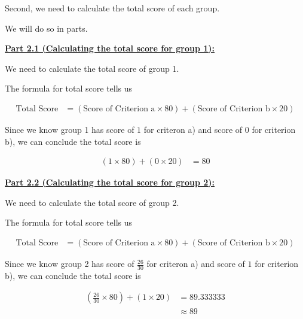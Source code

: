 \documentclass[12pt]{article}
\begin{document}
\begin{itemize}
    \bigskip

    Second, we need to calculate the total score of each group.

    \bigskip

    We will do so in parts.

    \bigskip

    \underline{\textbf{Part 2.1 (Calculating the total score for group 1):}}

    \bigskip

    We need to calculate the total score of group 1.

    \bigskip

    The formula for total score tells us

    \begin{align}
        \text{Total Score} &= (\text{Score of Criterion a} \times 80) + (\text{Score of Criterion b} \times 20)
    \end{align}

    \bigskip

    Since we know group 1 has score of $1$ for criteron a) and score of $0$ for
    criterion b), we can conclude the total score is

    \begin{align}
        (1 \times 80) + (0 \times 20) &= 80
    \end{align}

    \bigskip

    \underline{\textbf{Part 2.2 (Calculating the total score for group 2):}}

    \bigskip

    We need to calculate the total score of group 2.

    \bigskip

    The formula for total score tells us

    \begin{align}
        \text{Total Score} &= (\text{Score of Criterion a} \times 80) + (\text{Score of Criterion b} \times 20)
    \end{align}

    \bigskip

    Since we know group 2 has score of $\frac{26}{30}$ for criteron a) and score of $1$ for
    criterion b), we can conclude the total score is

    \begin{align}
        (\frac{26}{30} \times 80) + (1 \times 20) &= 89.333333\\
        &\approx 89
    \end{align}


\end{itemize}
\end{document}

